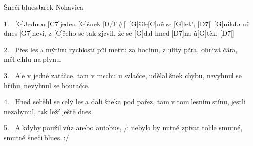 \begin{song}{Šnečí blues}{Jarek Nohavica}

\begin{xverse}{1.~}
[\large G]Jednou [\large C7]jeden [\large G]{šnek}  [\large D/F#|]{} [\large G]{ší}le[\large C]ně se [\large G]lek', [\large D7|]{}
[\large G]nikdo už dnes [\large G7]neví, z [\large C]{če}ho se tak zjevil,
že se [\large G]dal hned [\large D7]na  ú[\large G]těk. [\large D7|]{}
\end{xverse}


\begin{xverse}{2.~}
Přes les a mýtinu rychlostí půl metru za hodinu,
z ulity pára, ohnivá čára,
měl cihlu na plynu.
\end{xverse}


\begin{xverse}{3.~}
Ale v jedné zatáčce, tam v mechu u svlačce,
udělal šnek chybu, nevyhnul se hřibu,
nevyhnul se bouračce.
\end{xverse}


\begin{xverse}{4.~}
Hned seběhl se celý les a dali šneka pod pařez,
tam v tom lesním stínu, jestli nezahynul,
tak leží ještě dnes.
\end{xverse}


\begin{xverse}{5.~}
A kdyby použil vůz anebo autobus,
/: nebylo by nutné zpívat tohle smutné,
   smutné šnečí blues. :/
\end{xverse}

\end{song}
\chords{ \chordDFis }

